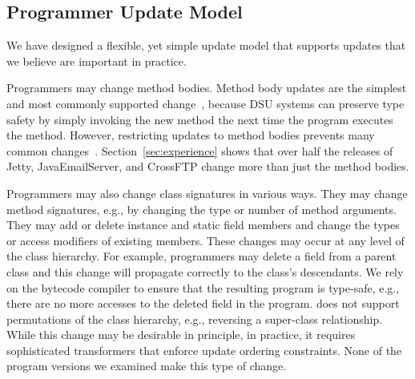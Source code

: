 

\subsection{Programmer Update Model}
\label{sec:updates}

We have designed a flexible, yet simple update model that supports
updates that we believe are important in practice. 

Programmers may
change method bodies. Method body updates are the simplest and most
commonly supported
change~\cite{JVMhotswap, VSEnC, eaddy05enc, GilmoreKW97, orso:java,
  K42reconfig, HjalmtyssonG98},
because DSU systems can preserve type safety by simply invoking the new
method the next time the program executes the method.  However,
restricting updates to method bodies prevents many common
changes~\cite{neamtiu05evolution}.  Section~\ref{sec:experience} shows
that over half the releases of Jetty, JavaEmailServer, and CrossFTP
change more than just the method bodies.

Programmers may also change class signatures in various ways.
They may change method signatures, e.g., by changing the type or
number of method arguments.  They may add or delete instance and
static field members and change the types or access modifiers of
existing members.
These changes may occur at any level of the class hierarchy.  For
example, programmers may delete 
a field from a parent class and this change will propagate correctly
to the class's descendants. We rely on the bytecode compiler to ensure that the resulting program is type-safe, e.g., there are no more accesses to the deleted field in the program.  
\DSU{} does not support permutations of the
class hierarchy, e.g., reversing a super-class relationship.  While
this change may be desirable in principle, in practice, it requires
sophisticated transformers that enforce update ordering
constraints. None of the program versions we examined make this type
of change.

